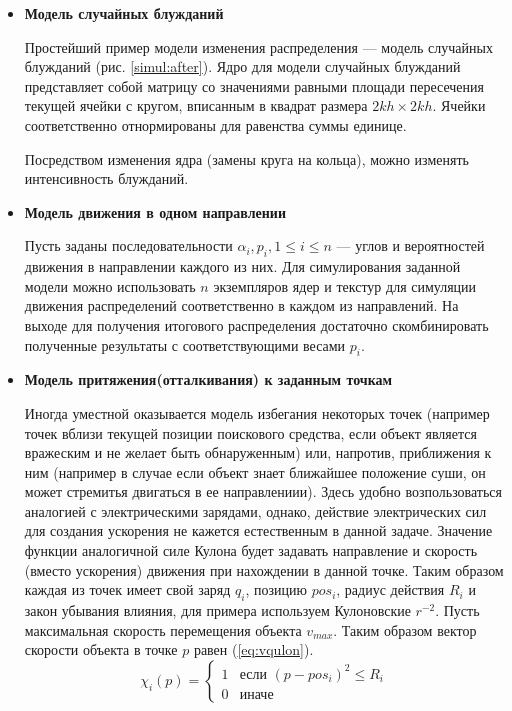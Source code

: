 \begin{itemize}
\item{
\textbf{Модель случайных блужданий}

Простейший пример модели изменения распределения --- модель случайных блужданий
(рис. \ref{simul:after}). Ядро для модели случайных блужданий представляет собой матрицу со
значениями равными площади пересечения текущей ячейки с кругом, вписанным в квадрат размера
$2kh \times 2kh$. Ячейки соответственно отнормированы для равенства суммы единице.

Посредством изменения ядра (замены круга на кольца), можно изменять интенсивность блужданий.
}
\item{
\textbf{Модель движения в одном направлении}

Пусть заданы последовательности $\alpha_i, p_i, 1 \le i \le n$ --- углов и вероятностей
движения в направлении каждого из них. Для симулирования заданной модели можно
использовать $n$ экземпляров ядер и текстур для симуляции движения распределений
соответственно в каждом из направлений. На выходе для получения итогового распределения
достаточно скомбинировать полученные результаты с соответствующими весами $p_i$.
}
\item{
\textbf{Модель притяжения(отталкивания) к заданным точкам}

Иногда уместной оказывается модель избегания некоторых точек (например точек вблизи
текущей позиции поискового средства, если объект является вражеским и не желает быть
обнаруженным) или, напротив, приближения к ним (например в случае если объект знает ближайшее
положение суши, он может стремитья двигаться в ее направлениии). Здесь 
удобно возпользоваться аналогией с электрическими зарядами, однако, действие электрических
сил для создания ускорения не кажется естественным в данной задаче. Значение функции
аналогичной силе Кулона будет задавать направление и скорость (вместо ускорения) движения
 при нахождении в данной точке. Таким образом каждая из точек имеет свой заряд $q_i$,
 позицию $pos_i$, радиус действия $R_i$ и закон убывания влияния, для примера используем
 Кулоновские $r^{-2}$. Пусть максимальная скорость перемещения объекта $v_{max}$.
Таким образом вектор скорости объекта в точке $p$ равен (\ref{eq:vqulon}).
\begin{equation}
  \chi_i(p) = 
  \left\{
    \begin{array}{ll}
      1 & \mbox{если } {(p - pos_i)^2 \le R_i} \\
      0 & \mbox{иначе }
    \end{array}
  \right.
\end{equation}

}
\end{itemize}
